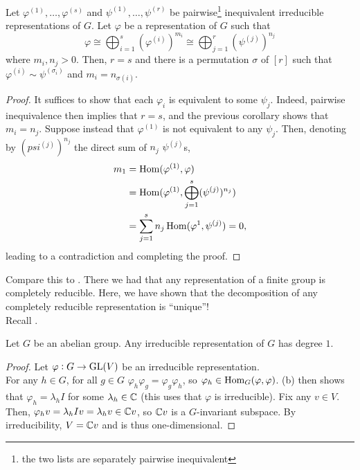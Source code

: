 		\begin{fcor}
			\label{cor: completely reducible unique decomp}
			Let $\varphi^{(1)},\ldots,\varphi^{(s)}$ and $\psi^{(1)},\ldots,\psi^{(r)}$ be pairwise\footnote{the two lists are separately pairwise inequivalent} inequivalent irreducible representations of $G$. Let $\varphi$ be a representation of $G$ such that
			\[ \varphi \cong \bigoplus_{i=1}^{s} (\varphi^{(i)})^{m_i} \cong \bigoplus_{j=1}^r (\psi^{(j)})^{n_j} \]
			where $m_i,n_j > 0$.
			Then, $r=s$ and there is a permutation $\sigma$ of $[r]$ such that $\varphi^{(i)} \sim \psi^{(\sigma_i)}$ and $m_i = n_{\sigma(i)}$.
		\end{fcor}
		\begin{proof}
			It suffices to show that each $\varphi_i$ is equivalent to some $\psi_j$. Indeed, pairwise inequivalence then implies that $r=s$, and the previous corollary shows that $m_i = n_j$. Suppose instead that $\varphi^{(1)}$ is not equivalent to any $\psi_j$. Then, denoting by $(psi^{(j)})^{n_j}$ the direct sum of $n_j$ $\psi^{(j)}$s,
			\begin{align*}
				m_1 &= \operatorname{Hom}(\varphi^{(1)}, \varphi) \\
					&= \operatorname{Hom}(\varphi^{(1)}, \bigoplus_{j=1}^s (\psi^{(j)})^{n_j}) \\
					&= \sum_{j=1}^s n_j \operatorname{Hom}(\varphi^{1},\psi^{(j)}) = 0,
			\end{align*}
			leading to a contradiction and completing the proof.
		\end{proof}

		Compare this to . There we had that any representation of a finite group is completely reducible. Here, we have shown that the decomposition of any completely reducible representation is ``unique''!\\

		Recall .

		\begin{ftheo}
			\label{theo: irreducible reps of finite abelian groups}
			Let $G$ be an abelian group. Any irreducible representation of $G$ has degree $1$.
		\end{ftheo}
		\begin{proof}
			Let $\varphi : G \to \operatorname{GL}(V)$ be an irreducible representation.\\
			For any $h \in G$, for all $g \in G$ $\varphi_h \varphi_g = \varphi_g \varphi_h$, so $\varphi_h \in \operatorname{Hom}_G(\varphi,\varphi)$. (b) then shows that $\varphi_h = \lambda_h I$ for some $\lambda_h \in \mathbb{C}$ (this uses that $\varphi$ is irreducible). Fix any $v \in V$. Then, $\varphi_h v = \lambda_h I v = \lambda_h v \in \mathbb{C} v$, so $\mathbb{C} v$ is a $G$-invariant subspace. By irreducibility, $V = \mathbb{C} v$ and is thus one-dimensional.
		\end{proof}


